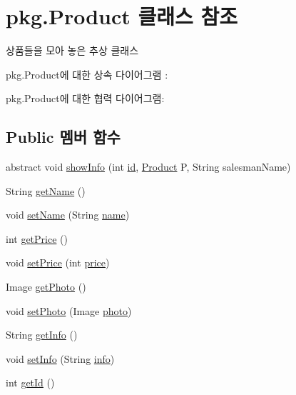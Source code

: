 \hypertarget{classpkg_1_1_product}{}\section{pkg.\+Product 클래스 참조}
\label{classpkg_1_1_product}


상품들을 모아 놓은 추상 클래스  




pkg.\+Product에 대한 상속 다이어그램 \+: 


pkg.\+Product에 대한 협력 다이어그램\+:
\subsection*{Public 멤버 함수}
\begin{DoxyCompactItemize}
\item 
abstract void \hyperlink{classpkg_1_1_product_a7b62e97da9dd4c77dbb0c8bfcac28ed8}{show\+Info} (int \hyperlink{classpkg_1_1_product_ac7846687b2d11faba3be1395fcbbab72}{id}, \hyperlink{classpkg_1_1_product}{Product} P, String salesman\+Name)
\item 
String \hyperlink{classpkg_1_1_product_a33ff6f7a51fc667ad2d2cc670424908c}{get\+Name} ()
\item 
void \hyperlink{classpkg_1_1_product_a9751f56879a4e8b76f958b26aaab4ec1}{set\+Name} (String \hyperlink{classpkg_1_1_product_acdadb9558664acdfd23eff5b2b77ae90}{name})
\item 
int \hyperlink{classpkg_1_1_product_af93b4414ec143311db57e6e4586d129e}{get\+Price} ()
\item 
void \hyperlink{classpkg_1_1_product_ad090e3760620ffe3fa253b169c84eb29}{set\+Price} (int \hyperlink{classpkg_1_1_product_a46c6eb6906d4ee2f6393515f41dba7c9}{price})
\item 
Image \hyperlink{classpkg_1_1_product_acb7237be160d1df9bcfda96a618f23dc}{get\+Photo} ()
\item 
void \hyperlink{classpkg_1_1_product_a2bb5fef6a450832b5d1c8121faeee53c}{set\+Photo} (Image \hyperlink{classpkg_1_1_product_a5d279eb4556860b90305cc26a3ee69be}{photo})
\item 
String \hyperlink{classpkg_1_1_product_a9609730b224bee5730f554067811446f}{get\+Info} ()
\item 
void \hyperlink{classpkg_1_1_product_a1e1baf71e00cde4a2ef6c36ec807b697}{set\+Info} (String \hyperlink{classpkg_1_1_product_ade3d909a0e7d15ec98c2f27eecd637cd}{info})
\item 
int \hyperlink{classpkg_1_1_product_a2f65335afe35080fa3402838b17d092e}{get\+Id} ()

\end{DoxyCompactItemize}
